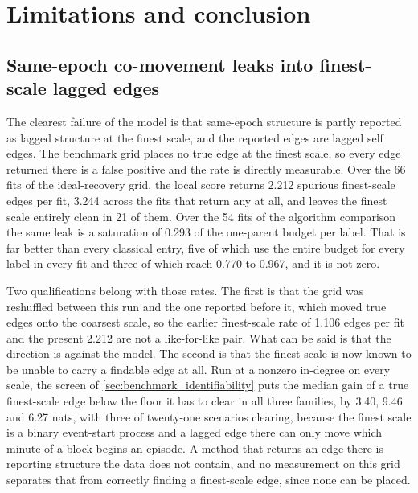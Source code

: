 \section{Limitations and conclusion}
\label{sec:limitations}

\subsection{Same-epoch co-movement leaks into finest-scale lagged edges}
\label{sec:lim_leak}

The clearest failure of the model is that same-epoch structure is partly reported
as lagged structure at the finest scale, and the reported edges are lagged self
edges. The benchmark grid places no true edge at the finest scale, so every edge
returned there is a false positive and the rate is directly measurable. Over the
66 fits of the ideal-recovery grid, the local score returns 2.212 spurious
finest-scale edges per fit, 3.244 across the fits that return any at all, and
leaves the finest scale entirely clean in 21 of them. Over the 54 fits of the
algorithm comparison the same leak is a saturation of 0.293 of the one-parent
budget per label. That is far better than every classical entry, five of which
use the entire budget for every label in every fit and three of which reach
0.770 to 0.967, and it is not zero.

Two qualifications belong with those rates. The first is that the grid was
reshuffled between this run and the one reported before it, which moved true
edges onto the coarsest scale, so the earlier finest-scale rate of 1.106 edges
per fit and the present 2.212 are not a like-for-like pair. What can be said is
that the direction is against the model. The second is that the finest scale is
now known to be unable to carry a findable edge at all. Run at a nonzero
in-degree on every scale, the screen of \cref{sec:benchmark_identifiability}
puts the median gain of a true finest-scale edge below the floor it has to clear
in all three families, by 3.40, 9.46 and 6.27 nats, with three of twenty-one
scenarios clearing, because the finest scale is a binary event-start process and
a lagged edge there can only move which minute of a block begins an episode. A
method that returns an edge there is reporting structure the data does not
contain, and no measurement on this grid separates that from correctly finding a
finest-scale edge, since none can be placed.

